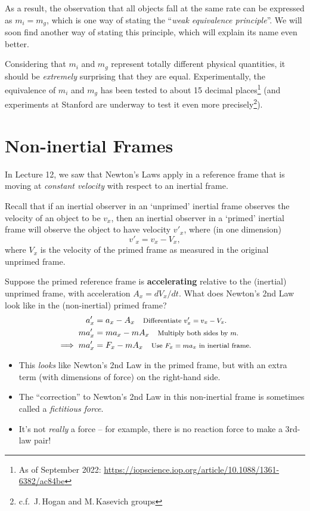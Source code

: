 \documentclass[11pt, letterpaper, openany]{book}
\newenvironment{exercise}[1][Exercise]{%
  \tcolorbox[blanker, breakable, left=1em,
    before skip=1em, after skip=1em,
    borderline west={3pt}{0pt}{PhysNavy},
    colback=PhysCream,
    before upper={\textcolor{PhysNavy}{\sffamily\bfseries #1:}\space}
  ]%
}{%
  \endtcolorbox%
}
\begin{document}
As a result, the observation that all objects fall at the same rate can be expressed as $m_i = m_g$, which is one way of stating the ``\textit{weak equivalence principle}''. We will soon find another way of stating this principle, which will explain its name even better.

Considering that $m_i$ and $m_g$ represent totally different physical quantities, it should be \textit{extremely} surprising that they are equal. Experimentally, the equivalence of $m_i$ and $m_g$ has been tested to about 15 decimal places\footnote{As of September 2022: \url{https://iopscience.iop.org/article/10.1088/1361-6382/ac84be}} (and experiments at Stanford are underway to test it even more precisely\footnote{c.f.\ J.\,Hogan and M.\,Kasevich groups}).

\section*{Non-inertial Frames}

In Lecture 12, we saw that Newton's Laws apply in a reference frame that is moving at \textit{constant velocity} with respect to an inertial frame.

Recall that if an inertial observer in an `unprimed' inertial frame observes the velocity of an object to be $v_x$, then an inertial observer in a `primed' inertial frame will observe the object to have velocity $v'_x$, where (in one dimension)
\[ v'_x = v_x - V_x, \]
where $V_x$ is the velocity of the primed frame as measured in the original unprimed frame.

\begin{exercise}[Exercise 2]
Suppose the primed reference frame is \textbf{accelerating} relative to the (inertial) unprimed frame, with acceleration $A_x = dV_x/dt$. What does Newton's 2nd Law look like in the (non-inertial) primed frame? \\
\textcolor{blue}{
\begin{align*}
    a'_x &= a_x - A_x \quad \text{\footnotesize{Differentiate $v'_x = v_x - V_x$.}} \\
    ma'_x &= ma_x - mA_x \quad \text{\footnotesize{Multiply both sides by $m$.}} \\
    \implies ma'_x &= F_x - mA_x \quad \text{\footnotesize{Use $F_x = ma_x$ in inertial frame.}}
\end{align*}
}
\begin{itemize}
    \item This \textit{looks} like Newton's 2nd Law in the primed frame, but with an extra term (with dimensions of force) on the right-hand side.
    \item The ``correction'' to Newton's 2nd Law in this non-inertial frame is sometimes called a \textit{fictitious force}.
    \item It's not \textit{really} a force -- for example, there is no reaction force to make a 3rd-law pair!
\end{itemize}
\end{exercise}
\end{document}
